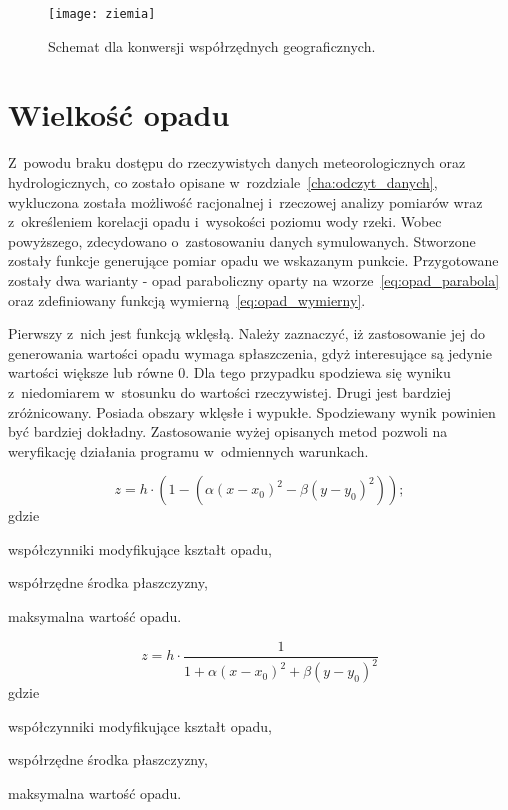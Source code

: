 \begin{figure}[!ht]
	\centering
	\texttt{[image: ziemia]}
	\caption{Schemat dla konwersji współrzędnych geograficznych.}
	\label{fig:ziemia}
\end{figure}

\section{Wielkość opadu}
\label{sec:funkcje_opadu}
Z~powodu braku dostępu do rzeczywistych danych meteorologicznych oraz hydrologicznych, co zostało opisane w~rozdziale~\ref{cha:odczyt_danych}, wykluczona została możliwość racjonalnej i~rzeczowej analizy pomiarów wraz z~określeniem korelacji opadu i~wysokości poziomu wody rzeki. Wobec powyższego, zdecydowano o~zastosowaniu danych symulowanych. Stworzone zostały funkcje generujące pomiar opadu we wskazanym punkcie. Przygotowane zostały dwa warianty - opad paraboliczny oparty na wzorze~\ref{eq:opad_parabola} oraz zdefiniowany funkcją wymierną~\ref{eq:opad_wymierny}.


Pierwszy z~nich jest funkcją wklęsłą. Należy zaznaczyć, iż zastosowanie jej do generowania wartości opadu wymaga spłaszczenia, gdyż interesujące są jedynie wartości większe lub równe 0. Dla tego przypadku spodziewa się wyniku z~niedomiarem w~stosunku do wartości rzeczywistej. Drugi jest bardziej zróżnicowany. Posiada obszary wklęsłe i wypukłe. Spodziewany wynik powinien być bardziej dokładny. Zastosowanie wyżej opisanych metod pozwoli na weryfikację działania programu w~odmiennych warunkach.

\begin{equation}
z = h \cdot (1 - (\alpha (x - x_0)^2 - \beta (y - y_0)^2) );
\label{eq:opad_parabola}
\end{equation}
gdzie
\begin{description}[leftmargin=3cm, itemsep=0cm, labelsep=0cm]
	\item[$\alpha, \beta$] współczynniki modyfikujące kształt opadu,
	\item[$x_0, y_0$] współrzędne środka płaszczyzny,
	\item[$h$] maksymalna wartość opadu.
\end{description}

\begin{equation}
z = h \cdot \frac{1}{1 + \alpha (x-x_0)^2 + \beta (y-y_0)^2}
\label{eq:opad_wymierny}
\end{equation}
gdzie
\begin{description}[leftmargin=3cm, itemsep=0cm, labelsep=0cm]
	\item[$\alpha, \beta$] współczynniki modyfikujące kształt opadu,
	\item[$x_0, y_0$] współrzędne środka płaszczyzny,
	\item[$h$] maksymalna wartość opadu.
\end{description}

